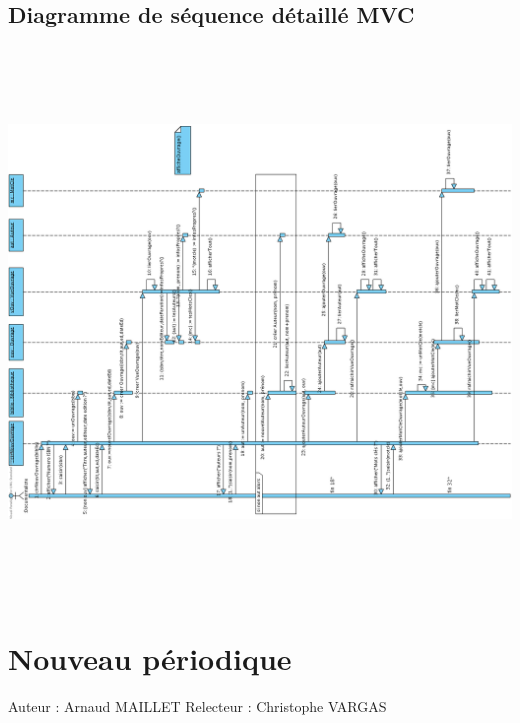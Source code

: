 \documentclass[a4paper,10pt]{report}
\begin{document}
\section*{Diagramme de séquence détaillé MVC}
\includegraphics[height=145mm]{NouvOuvrageMVC.png}

\newpage


\chapter*{Nouveau périodique}

Auteur : Arnaud MAILLET
Relecteur : Christophe VARGAS

\bigskip
\end{document}

